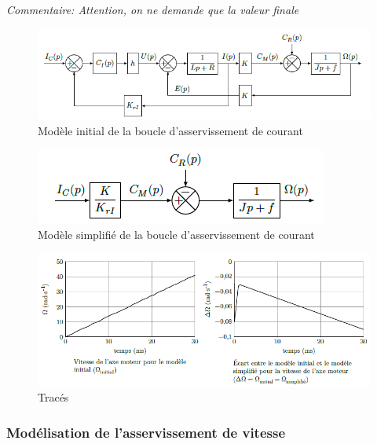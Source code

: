 \textit{Commentaire: Attention, on ne demande que la valeur finale}

\begin{figure}[!ht]
\begin{center}
 \includegraphics[width=0.9\linewidth]{img/img11}
\end{center}
\caption{Modèle initial de la boucle d'asservissement de courant}
\label{fig10}
\end{figure}

\begin{figure}[!ht]
\begin{center}
 \includegraphics[width=0.6\linewidth]{img/img12}
\end{center}
\caption{Modèle simplifié de la boucle d'asservissement de courant}
\label{fig11}
\end{figure}

\begin{figure}[!ht]
\begin{center}
 \includegraphics[width=0.9\linewidth]{img/img13}
\end{center}
\caption{Tracés}
\label{fig12}
\end{figure}

\subsubsection{Modélisation de l'asservissement de vitesse}

